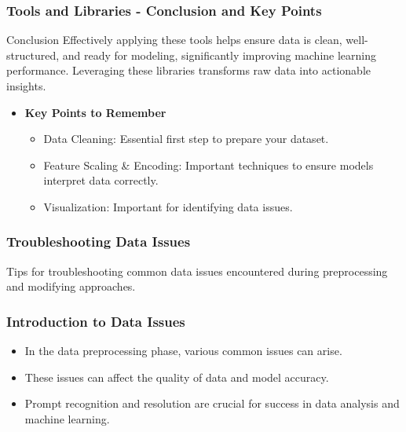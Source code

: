 \documentclass[aspectratio=169]{beamer}
\begin{document}
\begin{frame}[fragile]
    \frametitle{Tools and Libraries - Conclusion and Key Points}
    \begin{block}{Conclusion}
        Effectively applying these tools helps ensure data is clean, well-structured, and ready for modeling, significantly improving machine learning performance. 
        Leveraging these libraries transforms raw data into actionable insights.
    \end{block}

    \begin{itemize}
        \item \textbf{Key Points to Remember}
        \begin{itemize}
            \item Data Cleaning: Essential first step to prepare your dataset.
            \item Feature Scaling \& Encoding: Important techniques to ensure models interpret data correctly.
            \item Visualization: Important for identifying data issues.
        \end{itemize}
    \end{itemize}
\end{frame}

\begin{frame}
    \frametitle{Troubleshooting Data Issues}
    Tips for troubleshooting common data issues encountered during preprocessing and modifying approaches.
\end{frame}

\begin{frame}
    \frametitle{Introduction to Data Issues}
    \begin{itemize}
        \item In the data preprocessing phase, various common issues can arise.
        \item These issues can affect the quality of data and model accuracy.
        \item Prompt recognition and resolution are crucial for success in data analysis and machine learning.
    \end{itemize}
\end{frame}
\end{document}
